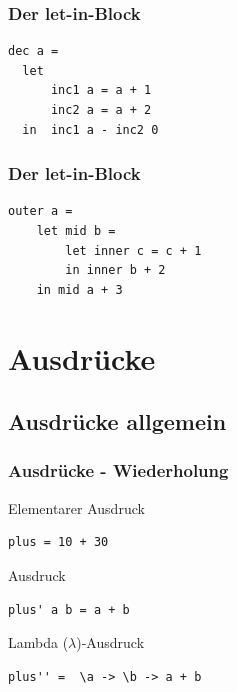 \documentclass[fleqn,11pt,aspectratio=43]{beamer}
\begin{document}
\begin{frame}[fragile]
\frametitle{Der let-in-Block}
\begin{lstlisting}
dec a = 
  let               
      inc1 a = a + 1
      inc2 a = a + 2
  in  inc1 a - inc2 0
\end{lstlisting}
\end{frame}

\begin{frame}[fragile]
\frametitle{Der let-in-Block}
\begin{lstlisting}
outer a = 
    let mid b = 
        let inner c = c + 1
        in inner b + 2
    in mid a + 3	
\end{lstlisting}
\end{frame}

\section{Ausdrücke~}
\subsection{Ausdrücke allgemein}
\begin{frame}[fragile]
\frametitle{Ausdrücke - Wiederholung} 
\begin{exampleblock}{Elementarer Ausdruck}
\begin{lstlisting}
plus = 10 + 30
\end{lstlisting}
\end{exampleblock}
\begin{exampleblock}{Ausdruck}
\begin{lstlisting}
plus' a b = a + b
\end{lstlisting}
\end{exampleblock}
\begin{exampleblock}{Lambda ($\lambda$)-Ausdruck}
\begin{lstlisting}
plus'' =  \a -> \b -> a + b
\end{lstlisting}
\end{exampleblock}
\end{frame}
\end{document}
